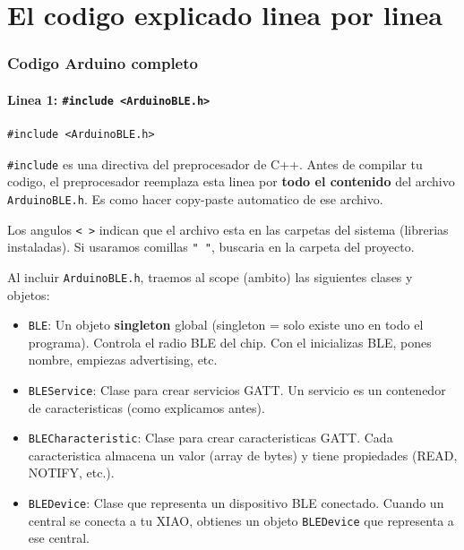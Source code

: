 \documentclass[11pt,a4paper]{article}
\begin{document}
\part{El codigo explicado linea por linea}


\section{Codigo Arduino completo}

\subsection{Linea 1: \texttt{\#include <ArduinoBLE.h>}}

\begin{lstlisting}[style=arduino]
#include <ArduinoBLE.h>
\end{lstlisting}

\texttt{\#include} es una directiva del preprocesador de C++. Antes
de compilar tu codigo, el preprocesador reemplaza esta linea por
\textbf{todo el contenido} del archivo \texttt{ArduinoBLE.h}. Es
como hacer copy-paste automatico de ese archivo.

Los angulos \texttt{< >} indican que el archivo esta en las carpetas
del sistema (librerias instaladas). Si usaramos comillas
\texttt{" "}, buscaria en la carpeta del proyecto.

Al incluir \texttt{ArduinoBLE.h}, traemos al scope (ambito) las
siguientes clases y objetos:

\begin{itemize}
    \item \texttt{BLE}: Un objeto \textbf{singleton} global
          (singleton = solo existe uno en todo el programa). Controla
          el radio BLE del chip. Con el inicializas BLE, pones nombre,
          empiezas advertising, etc.

    \item \texttt{BLEService}: Clase para crear servicios GATT.
          Un servicio es un contenedor de caracteristicas (como
          explicamos antes).

    \item \texttt{BLECharacteristic}: Clase para crear
          caracteristicas GATT. Cada caracteristica almacena un
          valor (array de bytes) y tiene propiedades (READ, NOTIFY,
          etc.).

    \item \texttt{BLEDevice}: Clase que representa un dispositivo
          BLE conectado. Cuando un central se conecta a tu XIAO,
          obtienes un objeto \texttt{BLEDevice} que representa a
          ese central.
\end{itemize}
\end{document}
